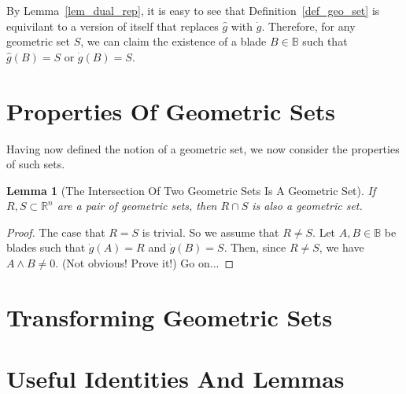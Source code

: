 \documentclass{birkjour}
\newtheorem{lem}[thm]{Lemma}
\theoremstyle{definition}
\theoremstyle{remark}
\numberwithin{equation}{section}
\newcommand{\R}{\mathbb{R}}
\newcommand{\B}{\mathbb{B}}
\newcommand{\gd}{\dot{g}}
\newcommand{\gh}{\hat{g}}
\begin{document}
By Lemma~\ref{lem_dual_rep}, it is easy to see that Definition~\ref{def_geo_set} is equivilant to a version of itself that replaces $\gh$ with $\gd$.
Therefore, for any geometric set $S$, we can claim the existence of a blade $B\in\B$ such that $\gh(B)=S$ or $\gd(B)=S$.

\section{Properties Of Geometric Sets}

Having now defined the notion of a geometric set, we now consider the properties of such sets.

\begin{lem}[The Intersection Of Two Geometric Sets Is A Geometric Set]
If $R,S\subset\R^n$ are a pair of geometric sets, then $R\cap S$ is also a geometric set.
\end{lem}
\begin{proof}
The case that $R=S$ is trivial.  So we assume that $R\neq S$.
Let $A,B\in\B$ be blades such that $\gd(A)=R$ and $\gd(B)=S$.
Then, since $R\neq S$, we have $A\wedge B\neq 0$.  (Not obvious!  Prove it!)
Go on...
\end{proof}







\section{Transforming Geometric Sets}


\section{Useful Identities And Lemmas}\label{sec_useful_identities}
\end{document}
